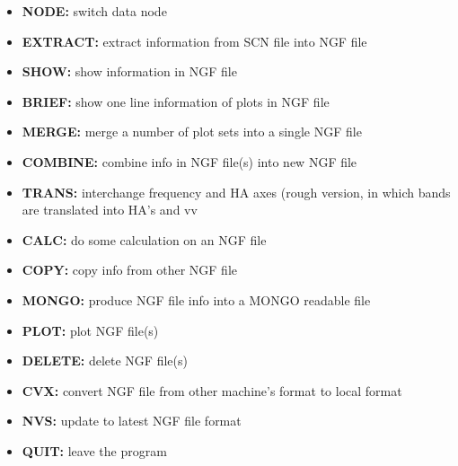 \begin{itemize} 

\item {\bf NODE:} switch data node 

\item {\bf EXTRACT:} extract information from SCN file into NGF file 

\item {\bf SHOW:} show information in NGF file 

\item {\bf BRIEF:} show one line information of plots in NGF file 

\item {\bf MERGE:} merge a number of plot sets into a single NGF file 

\item {\bf COMBINE:} combine info in NGF file(s) into new NGF file 

\item {\bf TRANS:} interchange frequency and HA axes (rough version, in which
bands are 
    translated into HA's and vv 

\item {\bf CALC:} do some calculation on an NGF file 

\item {\bf COPY:} copy info from other NGF file 

\item {\bf MONGO:} produce NGF file info into a MONGO readable file 

\item {\bf PLOT:} plot NGF file(s) 

\item {\bf DELETE:} delete NGF file(s) 

\item {\bf CVX:} convert NGF file from other machine's format to local format 

\item {\bf NVS:} update to latest NGF file format 

\item {\bf QUIT:} leave the program 
\end{itemize} 

